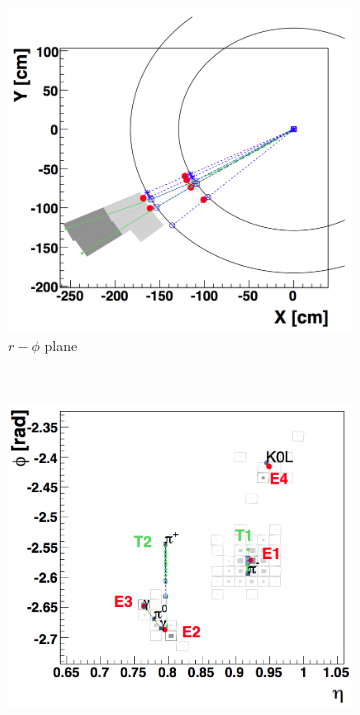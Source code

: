 \begin{figure}
  \centering
  \begin{subfigure}[b]{0.55\textwidth}
    \includegraphics[width=\textwidth]{tex/reco/fig/reco-pf-1.png}
    \caption{$r-\phi$ plane}
    \label{fig:pf-1}
  \end{subfigure} \\
  \begin{subfigure}[b]{0.44\textwidth}
    \includegraphics[width=\textwidth]{tex/reco/fig/reco-pf-2.png}

\end{subfigure}
\end{figure}

